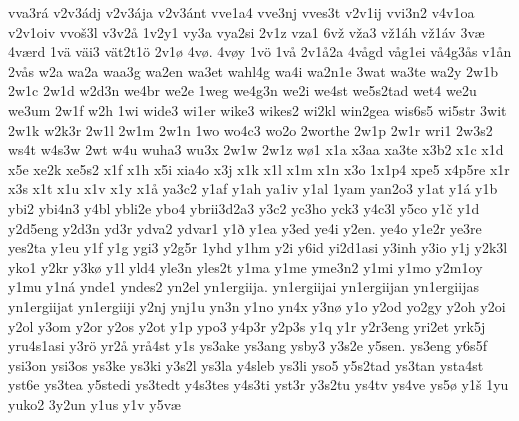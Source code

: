 {    vva3rá
    v2v3ádj
    v2v3ája
    v2v3ánt
    vve1a4
    vve3nj
    vves3t
    v2v1ij
    vvi3n2
    v4v1oa
    v2v1oiv
    vvoš3l
    v3v2å
    1v2y1
    vy3a
    vya2si
    2v1z
    vza1
    6vž
    vža3
    vž1áh
    vž1áv
    3væ
    4værd
    1vä
    väi3
    vät2t1ö
    2v1ø
    4vø.
    4vøy
    1vö
    1vå
    2v1å2a
    4vågd
    våg1ei
    vå4g3ås
    v1ån
    2vås
    w2a
    wa2a
    waa3g
    wa2en
    wa3et
    wahl4g
    wa4i
    wa2n1e
    3wat
    wa3te
    wa2y
    2w1b
    2w1c
    2w1d
    w2d3n
    we4br
    we2e
    1weg
    we4g3n
    we2i
    we4st
    we5s2tad
    wet4
    we2u
    we3um
    2w1f
    w2h
    1wi
    wide3
    wi1er
    wike3
    wikes2
    wi2kl
    win2gea
    wis6s5
    wi5str
    3wit
    2w1k
    w2k3r
    2w1l
    2w1m
    2w1n
    1wo
    wo4c3
    wo2o
    2worthe
    2w1p
    2w1r
    wri1
    2w3s2
    ws4t
    w4s3w
    2wt
    w4u
    wuha3
    wu3x
    2w1w
    2w1z
    wø1
    x1a
    x3aa
    xa3te
    x3b2
    x1c
    x1d
    x5e
    xe2k
    xe5s2
    x1f
    x1h
    x5i
    xia4o
    x3j
    x1k
    x1l
    x1m
    x1n
    x3o
    1x1p4
    xpe5
    x4p5re
    x1r
    x3s
    x1t
    x1u
    x1v
    x1y
    x1å
    ya3c2
    y1af
    y1ah
    ya1iv
    y1al
    1yam
    yan2o3
    y1at
    y1á
    y1b
    ybi2
    ybi4n3
    y4bl
    ybli2e
    ybo4
    ybrii3d2a3
    y3c2
    yc3ho
    yck3
    y4c3l
    y5co
    y1č
    y1d
    y2d5eng
    y2d3n
    yd3r
    ydva2
    ydvar1
    y1ð
    y1ea
    y3ed
    ye4i
    y2en.
    ye4o
    y1e2r
    ye3re
    yes2ta
    y1eu
    y1f
    y1g
    ygi3
    y2g5r
    1yhd
    y1hm
    y2i
    y6id
    yi2d1asi
    y3inh
    y3io
    y1j
    y2k3l
    yko1
    y2kr
    y3kø
    y1l
    yld4
    yle3n
    yles2t
    y1ma
    y1me
    yme3n2
    y1mi
    y1mo
    y2m1oy
    y1mu
    y1ná
    ynde1
    yndes2
    yn2el
    yn1ergiija.
    yn1ergiijai
    yn1ergiijan
    yn1ergiijas
    yn1ergiijat
    yn1ergiiji
    y2nj
    ynj1u
    yn3n
    y1no
    yn4x
    y3nø
    y1o
    y2od
    yo2gy
    y2oh
    y2oi
    y2ol
    y3om
    y2or
    y2os
    y2ot
    y1p
    ypo3
    y4p3r
    y2p3s
    y1q
    y1r
    y2r3eng
    yri2et
    yrk5j
    yru4s1asi
    y3rö
    yr2å
    yrå4st
    y1s
    ys3ake
    ys3ang
    ysby3
    y3s2e
    y5sen.
    ys3eng
    y6s5f
    ysi3on
    ysi3os
    ys3ke
    ys3ki
    y3s2l
    ys3la
    y4sleb
    ys3li
    yso5
    y5s2tad
    ys3tan
    ysta4st
    yst6e
    ys3tea
    y5stedi
    ys3tedt
    y4s3tes
    y4s3ti
    yst3r
    y3s2tu
    ys4tv
    ys4ve
    ys5ø
    y1š
    1yu
    yuko2
    3y2un
    y1us
    y1v
    y5væ
}
